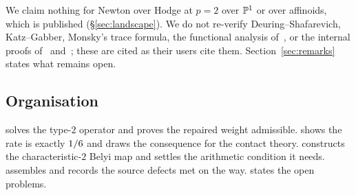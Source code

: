 We claim nothing for Newton over Hodge at $p = 2$ over $\mathbb{P}^1$ or over
affinoids, which is published (\S\ref{sec:landscape}). We do not re-verify
Deuring--Shafarevich, Katz--Gabber, Monsky's trace formula, the functional
analysis of~\cite[\S6]{kramermiller2020abelian}, or the internal proofs of~\cite{kedlayalittwitaszek2020tame} and~\cite{sugiyamayasuda2020belyi}; these
are cited as their users cite them. Section~\ref{sec:remarks} states what
remains open.

\subsection{Organisation}

 solves the type-$2$ operator and proves the repaired weight
admissible.  shows the rate is exactly $1/6$ and
draws the consequence for the contact theory. 
constructs the characteristic-$2$ Belyi map and settles the arithmetic
condition it needs.  assembles  and
records the source defects met on the way.  states the
open problems.
